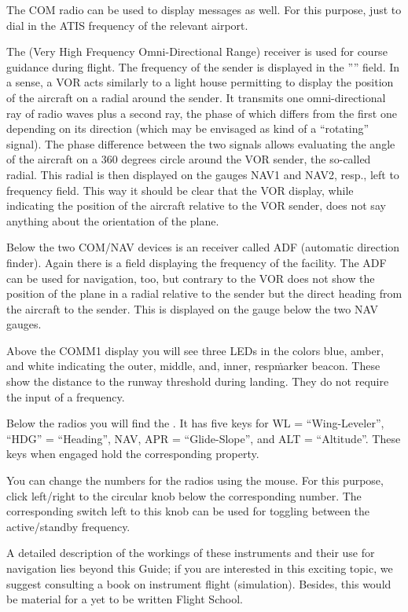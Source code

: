 The COM radio can be used to display  messages as well. For
this purpose, just to dial in the ATIS frequency of the relevant
airport.

The  (Very High Frequency Omni-Directional Range) receiver is used
for course
guidance during flight. The frequency of the sender is displayed in the
'''' field. In a sense,
a VOR acts similarly to a light house permitting to display the position of the
aircraft on a radial around the sender. It transmits one omni-directional ray of
radio
waves plus a second ray, the phase of which differs from the first one depending
on its
direction (which may be envisaged as kind of a ``rotating'' signal). The phase
difference between the two
signals allows evaluating the angle of the aircraft on a 360 degrees circle
around the VOR sender, the so-called radial. This radial is then displayed on
the gauges
NAV1 and NAV2, resp., left to frequency field. This way it should be clear that
the VOR display, while
indicating the position of the aircraft relative to the VOR sender, does not say
anything about the orientation of the plane.

Below the two COM/NAV devices is an  receiver called ADF (automatic
direction
finder). Again there is a field displaying the frequency of the facility. The
ADF can be
used for navigation, too, but contrary to the VOR does not show the position of
the plane
in a radial relative to the sender but the direct heading from the aircraft to
the
sender. This is displayed on the gauge below the two NAV gauges.

Above the COMM1 display you will see three LEDs in the colors blue, amber, and
white
indicating the outer, middle, and, inner, resp\. marker beacon. These show the distance to the
runway
threshold during landing. They do not require the input of a frequency.

Below the radios you will find the . It has five keys
for WL = ``Wing-Leveler'', ``HDG'' = ``Heading'', NAV, APR =
``Glide-Slope'', and ALT = ``Altitude''. These keys when engaged hold
the corresponding property.

You can change the numbers for the radios using the mouse. For this
purpose, click left/right to the circular knob below the corresponding
number. The corresponding switch left to this knob can be used for
toggling between the active/standby frequency.

A detailed description of the workings of these instruments and their use for
navigation
lies beyond this Guide; if you are interested in this exciting topic, we suggest
consulting a book on instrument flight (simulation). Besides, this would be
material for
a yet to be written \FlightGear{} Flight School.

